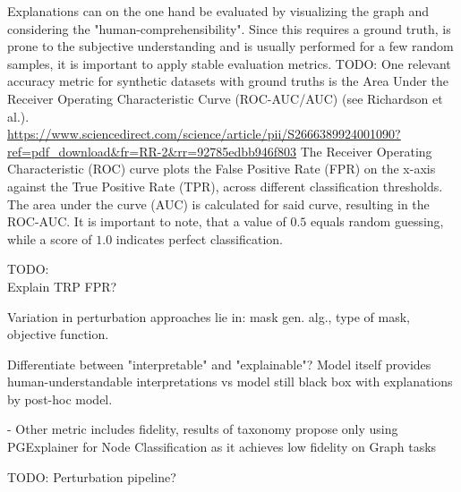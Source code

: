 Explanations can on the one hand be evaluated by visualizing the graph and considering the "human-comprehensibility". Since this requires a ground truth, is prone to the subjective understanding and is usually performed for a few random samples, it is important to apply stable evaluation metrics. TODO: One relevant accuracy metric for synthetic datasets with ground truths is the Area Under the Receiver Operating Characteristic Curve (ROC-AUC/AUC) (see Richardson et al.\cite{}). \\
\url{https://www.sciencedirect.com/science/article/pii/S2666389924001090?ref=pdf_download&fr=RR-2&rr=92785edbb946f803}
The Receiver Operating Characteristic (ROC) curve plots the False Positive Rate (FPR) on the x-axis against the True Positive Rate (TPR), across different classification thresholds. The area under the curve (AUC) is calculated for said curve, resulting in the ROC-AUC. It is important to note, that a value of $0.5$ equals random guessing, while a score of $1.0$ indicates perfect classification. \bigskip

TODO: \\
Explain TRP FPR?

Variation in perturbation approaches lie in: mask gen. alg., type of mask, objective function.

Differentiate between "interpretable" and "explainable"? Model itself provides human-understandable interpretations vs model still black box with explanations by post-hoc model.

- Other metric includes fidelity, results of taxonomy propose only using PGExplainer for Node Classification as it achieves low fidelity on Graph tasks

TODO: Perturbation pipeline?


